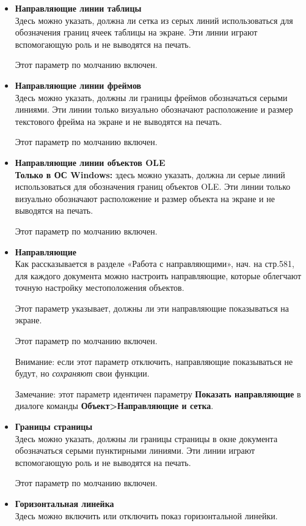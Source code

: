 ﻿\documentclass[a4paper,10pt]{article}
\begin{document}
 \begin{itemize}
  \item \textbf{Направляющие линии таблицы}\\
  Здесь можно указать, должна ли сетка из серых линий использоваться для обозначения границ ячеек таблицы на экране. Эти линии играют вспомогающую роль и не выводятся на печать.
  
  Этот параметр по молчанию включен.
  \item \textbf{Направляющие линии фреймов}\\
  Здесь можно указать, должны ли границы фреймов обозначаться серыми линиями. Эти линии только визуально обозначают расположение и размер текстового фрейма на экране и не выводятся на печать.
  
  Этот параметр по молчанию включен.
  \item \textbf{Направляющие линии объектов OLE}\\
  \textbf{Только в ОС Windows:} здесь можно указать, должна ли серые линий использоваться для обозначения границ объектов OLE. Эти линии только визуально обозначают расположение и размер объекта на экране и не выводятся на печать.
  
  Этот параметр по молчанию включен.
  \item \textbf{Направляющие}\\
  Как рассказывается в разделе «Работа с направляющими», нач. на стр.581, для каждого документа можно настроить направляющие, которые облегчают точную настройку местоположения объектов.
  
  Этот параметр указывает, должны ли эти направляющие показываться на экране.
  
  Этот параметр по молчанию включен.
  
  Внимание: если этот параметр отключить, направляющие показываться не будут, но \textit{сохраняют} свои функции.
  
  Замечание: этот параметр идентичен параметру \textbf{Показать направляющие} в диалоге команды \textbf{Объект>Направляющие и сетка}.
  \item \textbf{Границы страницы}\\
  Здесь можно указать, должны ли границы страницы в окне документа обозначаться серыми пунктирными линиями. Эти линии играют вспомогающую роль и не выводятся на печать.
  
  Этот параметр по молчанию включен.
  \item \textbf{Горизонтальная линейка}\\
  Здесь можно включить или отключить показ горизонтальной линейки.
  

\end{itemize}
\end{document}
